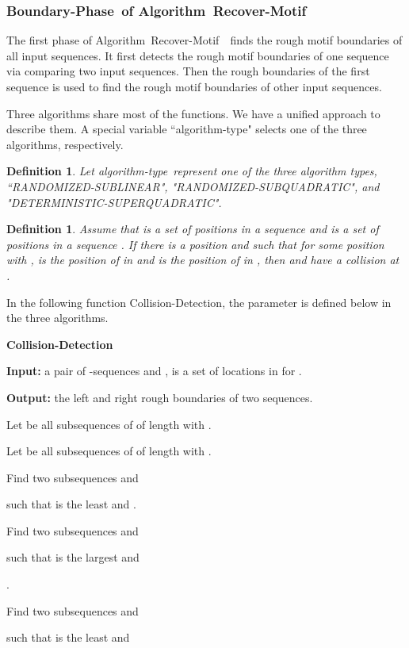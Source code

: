 \documentclass[11pt]{article}
\newtheorem{dfntn}[theoremfoo]{Definition}
\newenvironment{definition}{\pagebreak[1]\begin{dfntn}\rm}{\end{dfntn}}
\newcommand{\algmnam}{Recover-Motif}
\newcommand{\algmname}{Algorithm~\algmnam}
\newcommand{\algma}{\algmname~}
\newcommand{\phaseone}{Boundary-Phase}
\newcommand{\algtype}{{\rm algorithm-type}}
\newcommand{\sublinear}{{\rm RANDOMIZED-SUBLINEAR}}
\newcommand{\randomized}{{\rm RANDOMIZED-SUBQUADRATIC}}
\newcommand{\deterministic}{{\rm DETERMINISTIC-SUPERQUADRATIC}}
\begin{document}
\subsubsection{\phaseone~of \algma}
 The first phase of \algma~finds the rough motif boundaries of all
input sequences. It first detects the rough motif boundaries of one
sequence via comparing two input sequences. Then the rough
boundaries of the first sequence is used to find the rough motif
boundaries of other input sequences.


Three algorithms share most of the functions. We have a unified
approach to describe them. A special variable ``\algtype" selects
one of the three algorithms, respectively.

\begin{definition}
Let \algtype~represent one of the three algorithm types,
``\sublinear", "\randomized", and "\deterministic".
\end{definition}


\begin{definition}
Assume that  is a set of positions in a 
sequence  and  is a set of positions in a
 sequence . If there is a position
 and  such that for some position  with
,  is the position of  in 
and  is the position of  in , then 
and  have a {\it collision} at .
\end{definition}


In the following function Collision-Detection, the parameter
 is defined below in the three  algorithms.



\vskip 10pt {\bf Collision-Detection}

{\bf Input:} a pair of -sequences  and
,  is a set of locations in  for .


{\bf Output:} the left and right rough boundaries of two sequences.


\qquad Let  be all subsequences  of 
of length  with .

\qquad Let  be all subsequences  of 
of length  with .



\qquad Find two  subsequences 
and

\qquad  such that  is the
least and .

\qquad Find two subsequences  and

\qquad  such that  is
the largest and

\qquad .

\qquad Find two  subsequences 
and

\qquad  such that  is the
least and
\end{document}

